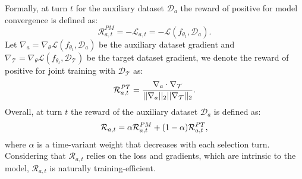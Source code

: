 Formally, at turn $t$ for the auxiliary dataset $\mathcal{D}_a$
the reward of positive for model convergence is defined as:
\vspace{-0.1cm}
\begin{equation}
\label{PM}
    \mathcal{R}^{PM}_{a,t} = -\mathcal{L}_{a,t} = -\mathcal{L}(f_{\theta_t}, \mathcal{D}_a).
\end{equation}
Let $\nabla_{a} = \nabla_\theta \mathcal{L}(f_{\theta_t}, \mathcal{D}_a)$ be the auxiliary dataset gradient and $\nabla_\mathcal{T} =\nabla_\theta\mathcal{L}(f_{\theta_t}, \mathcal{D}_\mathcal{T})$ be the target dataset gradient,
we denote the reward of positive for joint training with $\mathcal{D}_\mathcal{T}$ as:
\vspace{-0.1cm}
\begin{equation}
\vspace{-0.1cm}
\label{PT}
     \mathcal{R}^{PT}_{a,t} = \frac{\nabla_a\cdot\nabla_\mathcal{T}}{||\nabla_a||_2 ||\nabla_\mathcal{T}||_2}.
\end{equation}
Overall, at turn $t$ the reward of the auxiliary dataset $\mathcal{D}_a$ is defined as:
\vspace{-0.3cm}
\begin{equation}
\vspace{-0.1cm}
\label{reward}
    \mathcal{R}_{a,t} = \alpha \mathcal{R}^{PM}_{a,t} + (1 - \alpha) \mathcal{R}^{PT}_{a,t},
\end{equation}
where $\alpha$ is a time-variant weight that decreases with each selection turn.
Considering that $\mathcal{R}_{a,t}$ relies on the loss and gradients, which are intrinsic to the model, $\mathcal{R}_{a,t}$ is naturally training-efficient.
\vspace{-0.2cm}
